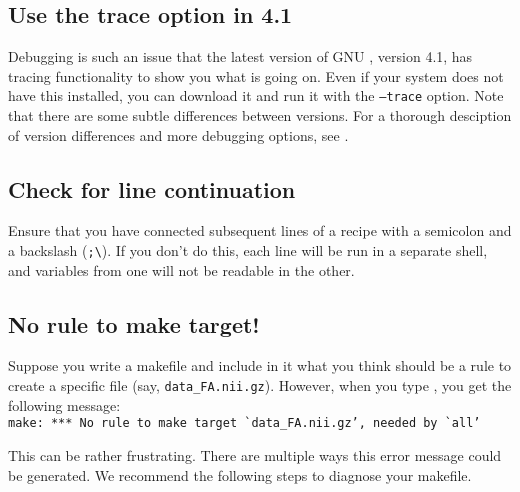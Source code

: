 \subsection{Use the trace option in \maken{} 4.1}
Debugging is such an issue that the latest version of GNU \maken{}, version 4.1, has tracing functionality to show you what is going on. Even if your system does not have this installed, you can download it and run it with the \texttt{--trace} option. Note that there are some subtle differences between \maken{} versions. For a thorough desciption of version differences and more debugging options, see \citep{GnuMakeBook}. %

\subsection{Check for line continuation}

Ensure that you have connected subsequent lines of a recipe with a semicolon and a backslash (\texttt{;\textbackslash}). If you don't do this, each line will be run in a separate shell, and variables from one will not be readable in the other.

\subsection{No rule to make target!}

Suppose you write a makefile and include in it what you think should be a rule to create a specific file (say, \texttt{data_FA.nii.gz}). However, when you type \maken, you get the following message: \\
\texttt{make: *** No rule to make target \`{}data_FA.nii.gz', needed by \`{}all'}

This can be rather frustrating. There are multiple ways this error message could be generated. We recommend the following steps to diagnose your makefile.

